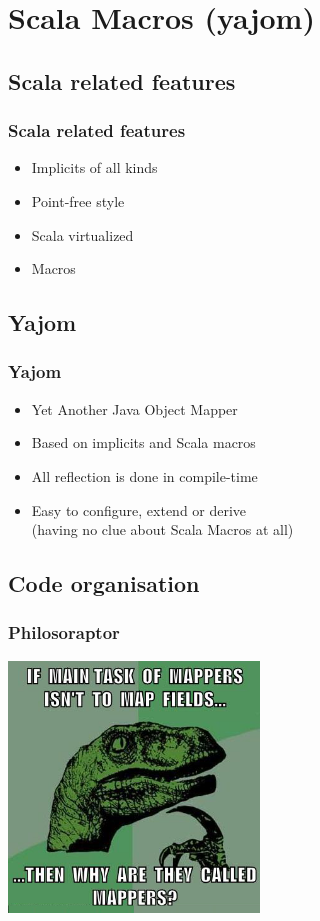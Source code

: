 \documentclass[14pt]{beamer}
\begin{document}
\section{Scala Macros (yajom)}
\subsection{Scala related features}
\frame
{\frametitle{Scala related features}
\begin{itemize}
  \item Implicits of all kinds
  \item Point-free style
  \item Scala virtualized
  \item Macros
\end{itemize}
}

\subsection{Yajom}
\frame
{\frametitle{Yajom}
\begin{itemize}
  \item Yet Another Java Object Mapper
  \item Based on implicits and Scala macros
  \item All reflection is done in compile-time
  \item Easy to configure, extend or derive \\ (having no clue about Scala Macros at all)
\end{itemize}
}

\subsection{Code organisation}
\frame
{\frametitle{Philosoraptor}
  \begin{center}
    \includegraphics[width=0.5\textwidth]{phil.png}
  \end{center}
}
\end{document}
